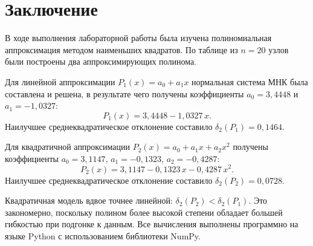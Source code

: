 \documentclass[a4paper, final]{article}
\begin{document}
\section*{Заключение}

В ходе выполнения лабораторной работы была изучена полиномиальная аппроксимация
методом наименьших квадратов. По таблице из $n = 20$ узлов были построены два
аппроксимирующих полинома.

Для линейной аппроксимации $P_1(x) = a_0 + a_1 x$ нормальная система МНК
была составлена и решена, в результате чего получены коэффициенты
$a_0 = 3{,}4448$ и $a_1 = -1{,}0327$:
\[
P_1(x) = 3{,}4448 - 1{,}0327\,x.
\]
Наилучшее среднеквадратическое отклонение составило $\delta_2(P_1) = 0{,}1464$.

Для квадратичной аппроксимации $P_2(x) = a_0 + a_1 x + a_2 x^2$ получены
коэффициенты $a_0 = 3{,}1147$, $a_1 = -0{,}1323$, $a_2 = -0{,}4287$:
\[
P_2(x) = 3{,}1147 - 0{,}1323\,x - 0{,}4287\,x^2.
\]
Наилучшее среднеквадратическое отклонение составило $\delta_2(P_2) = 0{,}0728$.

Квадратичная модель вдвое точнее линейной: $\delta_2(P_2) < \delta_2(P_1)$.
Это закономерно, поскольку полином более высокой степени обладает большей
гибкостью при подгонке к данным. Все вычисления выполнены программно на языке
Python с использованием библиотеки NumPy.
\end{document}
